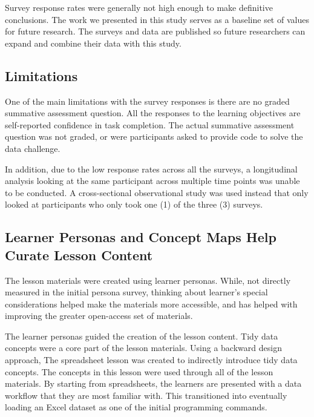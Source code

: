 \documentclass[030-workshop.tex]{subfiles}
\begin{document}
    Survey response rates were generally not high enough to make definitive conclusions.
    The work we presented in this study serves as a baseline set of values for future research.
    The surveys and data are published so future researchers can expand and combine their
    data with this study.

    \subsection{Limitations}

        One of the main limitations with the survey responses is there
        are no graded summative assessment question.
        All the responses to the learning objectives are self-reported confidence in task completion.
        The actual summative assessment question was not graded,
        or were participants asked to provide code to solve the data challenge.

        In addition, due to the low response rates across all the surveys,
        a longitudinal analysis looking at the same participant across multiple time points was unable to be conducted.
        A cross-sectional observational study was used instead that only looked at participants who only took one (1) of the three (3) surveys.

    \subsection{Learner Personas and Concept Maps Help Curate Lesson Content}

        The lesson materials were created using learner personas.
        While, not directly measured in the initial persona survey,
        thinking about learner's special considerations helped make the materials
        more accessible,
        and has helped with improving the greater open-access set of materials.

        The learner personas guided the creation of the lesson content.
        Tidy data concepts were a core part of the lesson materials.
        Using a backward design approach,
        The spreadsheet lesson was created to indirectly introduce tidy data concepts.
        The concepts in this lesson were used through all of the lesson materials.
        By starting from spreadsheets,
        the learners are presented with a data workflow that they are most familiar with.
        This transitioned into eventually loading an Excel dataset as one of the initial programming commands.
\end{document}
